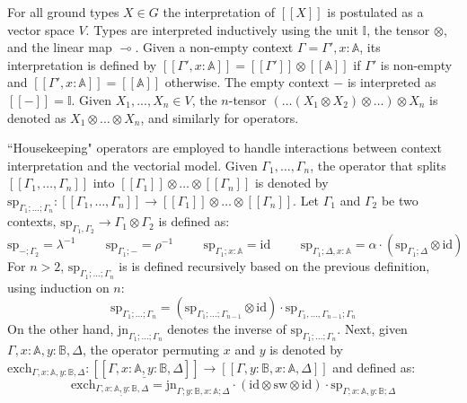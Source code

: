 For all ground types $X \in G$  the interpretation of $[\![X]\!]$  is postulated as a vector space $V$. Types are interpreted inductively using the unit $\mathbb{I}$, the tensor $\otimes$, and the linear map $\multimap$. Given a non-empty context $\Gamma=\Gamma',x: \mathbb{A}$, its interpretation is defined by $[\![\Gamma',x: \mathbb{A}]\!] = [\![\Gamma']\!] \otimes [\![\mathbb{A}]\!]$ if $\Gamma'$ is non-empty and $[\![\Gamma',x: \mathbb{A}]\!] = [\![\mathbb{A}]\!]$ otherwise. The empty context $-$ is interpreted as $[\![-]\!] = \mathbb{I}$. Given $X_{1}, . . . ,X_{n} \in V$, the $n$-tensor $(\ldots (X_1 \otimes X_2) \otimes \ldots ) \otimes X_{n}$ is denoted as $X_1 \otimes \ldots \otimes X_{n}$, and similarly for operators. 


``Housekeeping" operators are employed to handle interactions between context interpretation and the vectorial model. Given $\Gamma_{1}, \ldots, \Gamma_{n}$, the operator that splits $[\![\Gamma_{1}, \ldots, \Gamma_{n}]\!]$ into $[\![\Gamma_{1}]\!] \otimes \ldots \otimes [\![\Gamma_{n}]\!]  $ is denoted by $\text{sp}_{\Gamma_1;\ldots;\Gamma_n}: [\![\Gamma_{1}, \ldots, \Gamma_{n}]\!] \xrightarrow{} [\![\Gamma_{1}]\!] \otimes \ldots \otimes [\![\Gamma_{n}]\!] $. Let $\Gamma_1$ and $\Gamma_2$ be two contexts, $\text{sp}_{\Gamma_1, \Gamma_2} \rightarrow \Gamma_1\otimes \Gamma_2$ is defined as:
\begin{equation*}
  \text{sp}_{-; \Gamma_2} = \lambda^{-1} \hspace{1cm} \text{sp}_{\Gamma_1; -} = \rho^{-1} \hspace{1cm} \text{sp}_{\Gamma_1;x:\mathbb{A}} = \text{id} \hspace{1cm} \text{sp}_{\Gamma_1; \Delta, x: \mathbb{A}} = \alpha \cdot (\text{sp}_{\Gamma_1; \Delta} \otimes \text{id})
\end{equation*}
For $n>2$, $\text{sp}_{\Gamma_1;\ldots;\Gamma_n}$ is is defined recursively based on the previous definition, using induction on $n$:
\begin{equation*}
  \text{sp}_{\Gamma_1;\ldots;\Gamma_n} = (\text{sp}_{\Gamma_1;\ldots;\Gamma_{n-1}} \otimes \text{id} )\cdot \text{sp}_{\Gamma_1, \ldots, \Gamma_{n-1} ;\Gamma_n}
\end{equation*}
On the other hand, $\text{jn}_{\Gamma_1;\ldots;\Gamma_n}$ denotes the inverse of $\text{sp}_{\Gamma_1;\ldots;\Gamma_n}$. Next, given $\Gamma, x : \mathbb{A}, y : \mathbb{B},\Delta$, the operator permuting $x$ and $y$ is denoted by $\text{exch}_{\Gamma, x : \mathbb{A}, y : \mathbb{B},\Delta}: [\![\Gamma,\underline{ x : \mathbb{A}, y : \mathbb{B}},\Delta]\!] \xrightarrow{} [\![\Gamma, y : \mathbb{B}, x : \mathbb{A}, \Delta]\!] $ and defined as:
\begin{equation*}
  \text{exch}_{\Gamma, \underline{ x : \mathbb{A}, y : \mathbb{B}},\Delta} = \text{jn}_{\Gamma; y:\mathbb{B}, x:\mathbb{A};\Delta} \cdot (\text{id}\otimes \text{sw} \otimes \text{id} ) \cdot \text{sp}_{\Gamma; x:\mathbb{A}, y:\mathbb{B};\Delta}
\end{equation*} 


